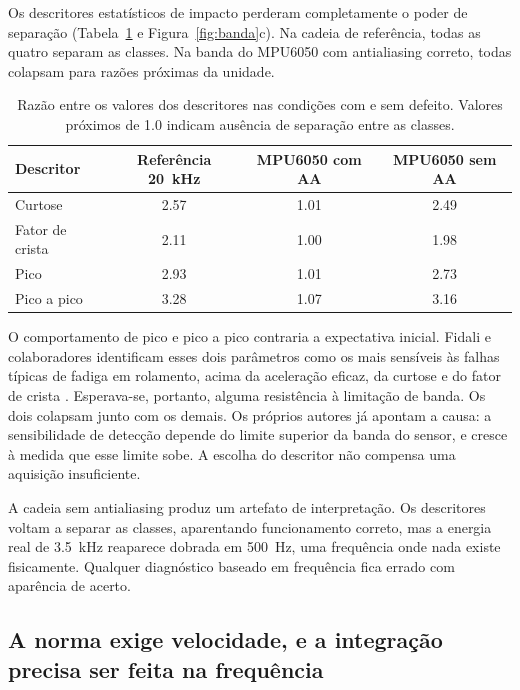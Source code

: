 \documentclass[11pt,a4paper]{article}
\begin{document}
Os descritores estatísticos de impacto perderam completamente o poder de separação
(Tabela~\ref{tab:features} e Figura~\ref{fig:banda}c). Na cadeia de referência, todas as quatro separam as classes.
Na banda do MPU6050 com antialiasing correto, todas colapsam para razões próximas da
unidade.

\begin{table}[!htb]
\centering
\caption{Razão entre os valores dos descritores nas condições com e sem defeito. Valores
próximos de \num{1,0} indicam ausência de separação entre as classes.}
\label{tab:features}
\small
\begin{tabular}{lccc}
\toprule
Descritor & Referência \SI{20}{\kilo\hertz} & MPU6050 com AA & MPU6050 sem AA \\
\midrule
Curtose          & \num{2,57} & \num{1,01} & \num{2,49} \\
Fator de crista  & \num{2,11} & \num{1,00} & \num{1,98} \\
Pico             & \num{2,93} & \num{1,01} & \num{2,73} \\
Pico a pico      & \num{3,28} & \num{1,07} & \num{3,16} \\
\bottomrule
\end{tabular}
\end{table}

O comportamento de pico e pico a pico contraria a expectativa inicial. Fidali e
colaboradores identificam esses dois parâmetros como os mais sensíveis às falhas típicas
de fadiga em rolamento, acima da aceleração eficaz, da curtose e do fator de crista
\cite{fidali2024}. Esperava-se, portanto, alguma resistência à limitação de banda. Os dois
colapsam junto com os demais. Os próprios autores já apontam a causa: a sensibilidade de
detecção depende do limite superior da banda do sensor, e cresce à medida que esse limite
sobe. A escolha do descritor não compensa uma aquisição insuficiente.

A cadeia sem antialiasing produz um artefato de interpretação. Os descritores voltam a
separar as classes, aparentando funcionamento correto, mas a energia real de
\SI{3,5}{\kilo\hertz} reaparece dobrada em \SI{500}{\hertz}, uma frequência onde nada
existe fisicamente. Qualquer diagnóstico baseado em frequência fica errado com aparência
de acerto.

\subsection{A norma exige velocidade, e a integração precisa ser feita na frequência}
\label{ssec:norma}
\end{document}
